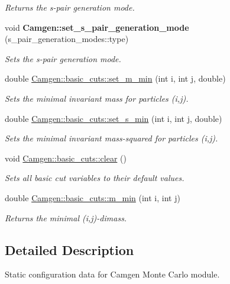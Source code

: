 \begin{DoxyCompactItemize}
\begin{DoxyCompactList}\small\item\em Returns the s-\/pair generation mode. \end{DoxyCompactList}\item 
\hypertarget{a00878_a1087174af481b616729434d2c8da413b}{}void {\bfseries Camgen\+::set\+\_\+s\+\_\+pair\+\_\+generation\+\_\+mode} (s\+\_\+pair\+\_\+generation\+\_\+modes\+::type)\label{a00878_a1087174af481b616729434d2c8da413b}

\begin{DoxyCompactList}\small\item\em Sets the s-\/pair generation mode. \end{DoxyCompactList}\item 
double \hyperlink{a00879_a2c6ac3377c1cfcca9c07fd789eb6d8a1}{Camgen\+::basic\+\_\+cuts\+::set\+\_\+m\+\_\+min} (int i, int j, double)
\begin{DoxyCompactList}\small\item\em Sets the minimal invariant mass for particles (i,j). \end{DoxyCompactList}\item 
double \hyperlink{a00879_a06768fc1ac5f34d8657a1b1dfd0a104d}{Camgen\+::basic\+\_\+cuts\+::set\+\_\+s\+\_\+min} (int i, int j, double)
\begin{DoxyCompactList}\small\item\em Sets the minimal invariant mass-\/squared for particles (i,j). \end{DoxyCompactList}\item 
\hypertarget{a00879_a7a908084900d0916765a80c48cbde675}{}void \hyperlink{a00879_a7a908084900d0916765a80c48cbde675}{Camgen\+::basic\+\_\+cuts\+::clear} ()\label{a00879_a7a908084900d0916765a80c48cbde675}

\begin{DoxyCompactList}\small\item\em Sets all basic cut variables to their default values. \end{DoxyCompactList}\item 
\hypertarget{a00879_ad9a932146d48ae43b7f29776cd917921}{}double \hyperlink{a00879_ad9a932146d48ae43b7f29776cd917921}{Camgen\+::basic\+\_\+cuts\+::m\+\_\+min} (int i, int j)\label{a00879_ad9a932146d48ae43b7f29776cd917921}

\begin{DoxyCompactList}\small\item\em Returns the minimal (i,j)-\/dimass. \end{DoxyCompactList}\end{DoxyCompactItemize}


\subsection{Detailed Description}
Static configuration data for Camgen Monte Carlo module. 

